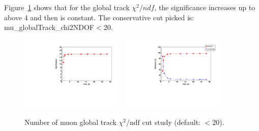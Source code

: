 Figure~\ref{fig:mu_globalTrack_chi2NDOF} shows that for the global track $\chi^2/ndf$, the significance increases 
up to above 4 and then is constant. The conservative cut picked is: mu\_globalTrack\_chi2NDOF$<$20.
%
\begin{figure}[h!]
 \begin{center}
   \includegraphics[angle=0,width=0.45\textwidth]{chap_YInPbPbColl2011_figures/GlChi2_Significance1}
   \includegraphics[angle=0,width=0.45\textwidth]{chap_YInPbPbColl2011_figures/GlChi2_SigBkgRejEff}
   \caption{Number of muon global track $\chi^2/\text{ndf}$ cut study  (default: $<20$).} %
   \label{fig:mu_globalTrack_chi2NDOF}
 \end{center}
\end{figure}


